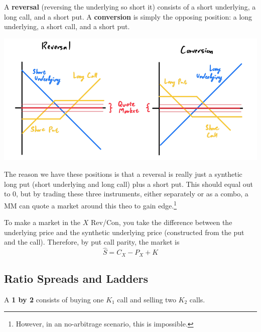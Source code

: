 \documentclass{article}
\begin{document}
    \begin{definition}
      A \textbf{reversal} (reversing the underlying so short it) consists of a short underlying, a long call, and a short put. A \textbf{conversion} is simply the opposing position: a long underlying, a short call, and a short put. 
      \begin{center}
        \includegraphics[scale=0.3]{img/reversal_conversion.png}
      \end{center}
      The reason we have these positions is that a reversal is really just a synthetic long put (short underlying and long call) plus a short put. This should equal out to $0$, but by trading these three instruments, either separately or as a combo, a MM can quote a market around this theo to gain edge.\footnote{However, in an no-arbitrage scenario, this is impossible.} 
    \end{definition}

    \begin{example}
      To make a market in the $X$ Rev/Con, you take the difference between the underlying price and the synthetic underlying price (constructed from the put and the call). Therefore, by put call parity, the market is
      \begin{equation}
        \hat{S} = C_X - P_X + K
      \end{equation}
    \end{example}

  \subsection{Ratio Spreads and Ladders}

    \begin{definition}
      A \textbf{1 by 2} consists of buying one $K_1$ call and selling two $K_2$ calls. 
    \end{definition}
\end{document}
